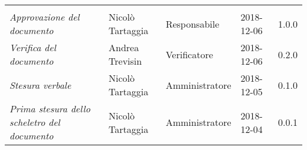 \newpage 
\section*{}
\begin{table}[H]
	\centering
	\begin{tabular}{p{4cm}|C{3cm}|C{3cm}|R{2.5cm}|R{2cm}}
		
		 & & & & \\
		
		
		\emph{Approvazione del documento} & Nicolò Tartaggia & Responsabile & 2018-12-06 & 1.0.0 \\
		\hline
		
		\emph{Verifica del documento} & Andrea Trevisin & Verificatore & 2018-12-06 & 0.2.0 \\
		\hline

		\emph{Stesura verbale} & Nicolò Tartaggia & Amministratore & 2018-12-05 & 0.1.0 \\
		\hline
		
		\emph{Prima stesura dello scheletro del documento} & Nicolò Tartaggia & Amministratore & 2018-12-04 & 0.0.1 \\
		
	\end{tabular}
	
\end{table}


\clearpage